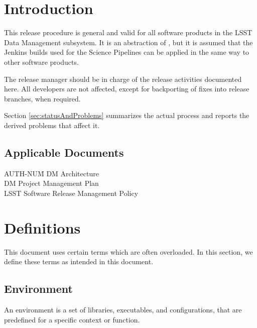 \section{Introduction} \label{sec:intro}

This release procedure is general and valid for all software products in the LSST Data Management subsystem.
It is an abstraction of , but it is assumed that the Jenkins builds used for the Science Pipelines can be applied in the same way to other software products. 

The release manager should be in charge of the release activities documented here.  
All developers are not affected, except for backporting of fixes into release branches, when required.

Section \ref{sec:statusAndProblems} summarizes the actual process and reports the derived problems that affect it.


\subsection{Applicable Documents}

\begin{tabbing}
AUTH-NUM\= \kill
{} \>     DM Architecture\\
 \>     DM Project Management Plan   \\
 \>     LSST Software Release Management Policy \\
\end{tabbing}


\newpage
\section{Definitions} \label{sec:definitions}

This document uses certain terms which are often overloaded. In this section, we define these terms as intended in this document.


\subsection{Environment} \label{sec:envdef}

An environment is a set of libraries, executables, and configurations, that are predefined for a specific context or function.

